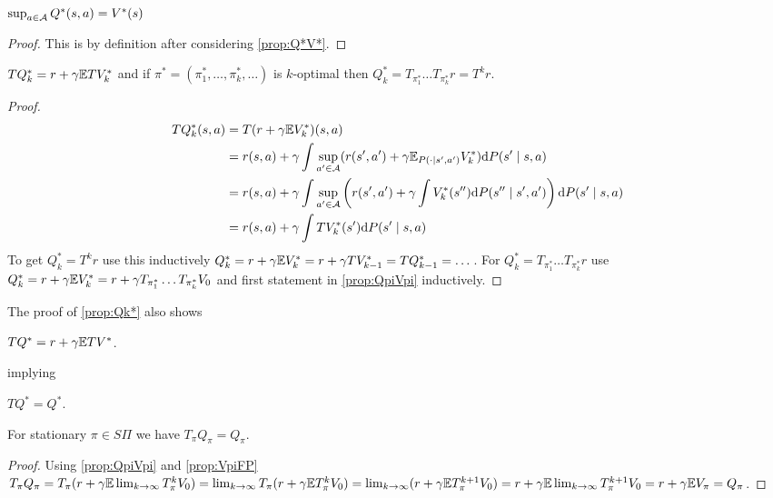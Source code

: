 \begin{prop}
  $\sup_{a \in \mathcal{A}} Q^*(s, a) = V^*(s)$
\end{prop}
\begin{proof}
  This is by definition after considering \cref{prop:Q*V*}.
\end{proof}

\begin{prop}
  $TQ^*_k = r + \gamma \mathbb{E} T V^*_k$ and if
  $\pi^* = (\pi^*_1, \dots, \pi^*_k, \dots)$
  is $k$-optimal then
  $Q^*_k = T_{\pi^*_1} \dots T_{\pi^*_k} r = T^k r$.
  \label{prop:Qk*}
\end{prop}
\begin{proof}
  \begin{align*}
    TQ^*_k(s,a) &= T(r + \gamma \mathbb{E} V^*_k)(s,a)
    \\ &= r(s,a) + \gamma
    \int \sup_{a' \in \mathcal{A}} (r(s',a') + \gamma \mathbb{E}_{P(\cdot \mid s', a')} V^*_k)
    \mathrm{d} P(s' \mid s,a)
    \\ &=r(s,a) + \gamma
    \int \sup_{a' \in \mathcal{A}} \left(r(s',a') + \gamma
    \int V_k^*(s'') \mathrm{d} P(s'' \mid s', a') \right)
    \mathrm{d} P(s' \mid s,a)
    \\ &= r(s, a) + \gamma
    \int T V^*_k(s') \mathrm{d} P(s' \mid s, a)
  \end{align*}
  To get $Q^*_k = T^k r$ use this inductively
  $Q^*_k = r + \gamma \mathbb{E} V^*_k = r+ \gamma TV^*_{k-1}
  = T Q^*_{k-1} = \dots$.
  For $Q^*_k = T_{\pi^*_1} \dots T_{\pi^*_k} r$ use
  $Q^*_k = r + \gamma \mathbb{E} V^*_k =
  r + \gamma T_{\pi^*_1} \dots T_{\pi^*_k} V_0$
  and first statement in \cref{prop:QpiVpi} inductively.
\end{proof}
The proof of \cref{prop:Qk*} also shows
\begin{prop}
  $TQ^* = r + \gamma \mathbb{E} T V^*$.
\end{prop}
implying
\begin{prop}
  $TQ^* = Q^*$.
  \label{prop:Q*FP}
\end{prop}

\begin{prop}
  For stationary $\pi \in S\Pi$ we have
  $T_\pi Q_\pi = Q_\pi$.
  \label{prop:QpiFP}
\end{prop}
\begin{proof}
  Using \cref{prop:QpiVpi} and \cref{prop:VpiFP}
  $T_\pi Q_\pi = T_\pi (r + \gamma \mathbb{E} \lim_{k\to\infty} T_\pi^k V_0)
  = \lim_{k\to\infty} T_\pi (r + \gamma \mathbb{E} T_\pi^k V_0)
  = \lim_{k\to\infty} (r + \gamma \mathbb{E} T_\pi^{k+1} V_0)
  = r + \gamma \mathbb{E} \lim_{k\to\infty} T^{k+1}_\pi V_0
  = r + \gamma \mathbb{E} V_\pi = Q_\pi$.
\end{proof}

